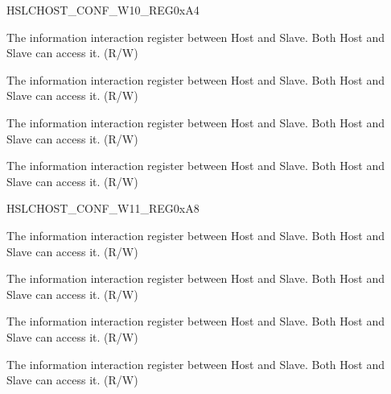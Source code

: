\begin{register}{H}{SLCHOST\_CONF\_W10\_REG}{0xA4}\label{regdesc:SLCHOSTCONFW10REG}
%
%
%
%
\regnewline%
\begin{regdesc}\begin{reglist}
\item [SLCHOST\_CONF43]The information interaction register between Host and Slave. Both Host and Slave can access it. (R/W)
\item [SLCHOST\_CONF42]The information interaction register between Host and Slave. Both Host and Slave can access it. (R/W)
\item [SLCHOST\_CONF41]The information interaction register between Host and Slave. Both Host and Slave can access it. (R/W)
\item [SLCHOST\_CONF40]The information interaction register between Host and Slave. Both Host and Slave can access it. (R/W)
\end{reglist}\end{regdesc}
\end{register}


\begin{register}{H}{SLCHOST\_CONF\_W11\_REG}{0xA8}\label{regdesc:SLCHOSTCONFW11REG}
%
%
%
%
\regnewline%
\begin{regdesc}\begin{reglist}
\item [SLCHOST\_CONF47]The information interaction register between Host and Slave. Both Host and Slave can access it. (R/W)
\item [SLCHOST\_CONF46]The information interaction register between Host and Slave. Both Host and Slave can access it. (R/W)
\item [SLCHOST\_CONF45]The information interaction register between Host and Slave. Both Host and Slave can access it. (R/W)
\item [SLCHOST\_CONF44]The information interaction register between Host and Slave. Both Host and Slave can access it. (R/W)
\end{reglist}\end{regdesc}
\end{register}


